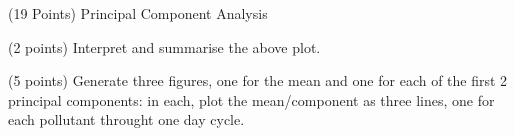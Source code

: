 \documentclass[12pt]{article}
\begin{document}
\begin{question}{(19 Points) Principal Component Analysis}
\begin{subquestion}{(2 points) Interpret and summarise the above plot.}
\end{subquestion}


\begin{subquestion}{(5 points) Generate three figures, one for the mean and one for each of the first 2 principal components: in each, plot the mean/component as three lines, one for each pollutant throught one day cycle. }






\end{subquestion}


\end{question}
\end{document}
